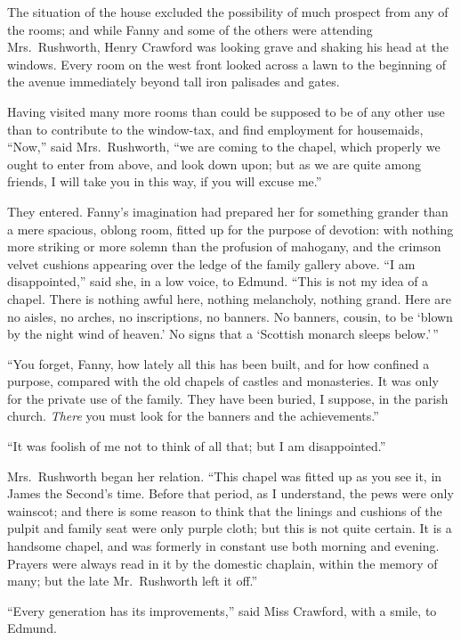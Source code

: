 The situation of the house excluded the possibility
of much prospect from any of the rooms; and while Fanny
and some of the others were attending Mrs.\ Rushworth,
Henry Crawford was looking grave and shaking his head
at the windows.  Every room on the west front looked
across a lawn to the beginning of the avenue immediately
beyond tall iron palisades and gates.

Having visited many more rooms than could be supposed to be
of any other use than to contribute to the window-tax, and
find employment for housemaids, ``Now,'' said Mrs.\ Rushworth,
``we are coming to the chapel, which properly we ought
to enter from above, and look down upon; but as we
are quite among friends, I will take you in this way,
if you will excuse me.''

They entered.  Fanny's imagination had prepared her
for something grander than a mere spacious, oblong room,
fitted up for the purpose of devotion:  with nothing more
striking or more solemn than the profusion of mahogany,
and the crimson velvet cushions appearing over the ledge
of the family gallery above.  ``I am disappointed,''
said she, in a low voice, to Edmund.  ``This is not
my idea of a chapel.  There is nothing awful here,
nothing melancholy, nothing grand.  Here are no aisles,
no arches, no inscriptions, no banners.  No banners,
cousin, to be `blown by the night wind of heaven.'
No signs that a `Scottish monarch sleeps below.'\,''

``You forget, Fanny, how lately all this has been built,
and for how confined a purpose, compared with the old
chapels of castles and monasteries.  It was only for
the private use of the family.  They have been buried,
I suppose, in the parish church.  \emph{There} you must look
for the banners and the achievements.''

``It was foolish of me not to think of all that; but I
am disappointed.''

Mrs.\ Rushworth began her relation.  ``This chapel was fitted up
as you see it, in James the Second's time.  Before that period,
as I understand, the pews were only wainscot; and there
is some reason to think that the linings and cushions
of the pulpit and family seat were only purple cloth;
but this is not quite certain.  It is a handsome chapel,
and was formerly in constant use both morning and evening.
Prayers were always read in it by the domestic chaplain,
within the memory of many; but the late Mr.\ Rushworth left
it off.''

``Every generation has its improvements,'' said Miss Crawford,
with a smile, to Edmund.

